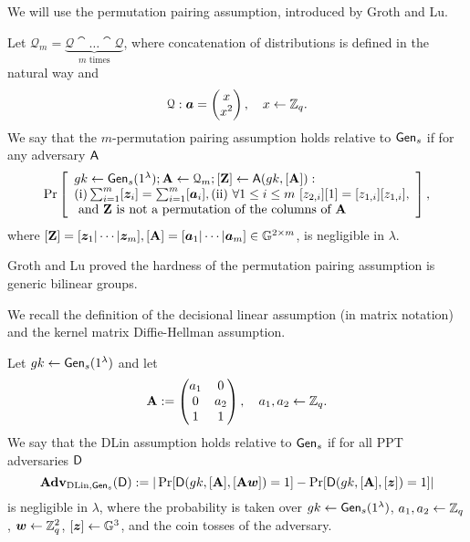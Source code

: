 We will use the permutation pairing assumption, introduced by Groth and Lu.
\begin{definition}\label{def:ppa}
Let $\mathcal{Q}_{m}=\underbrace{\mathcal{Q}\cat\ldots\cat\mathcal{Q}}_{m\text{ times}}$, where concatenation of  distributions is defined in the natural way and 
$$\mathcal{Q}: {\boldsymbol{a}}=\left(\begin{matrix}x\\x^2\end{matrix}\right),\quad x\gets\mathbb{Z}_q.$$
We say that the $m$-permutation pairing assumption holds relative to $\mathsf{Gen}_s$ if for any adversary $\mathsf{A}$
$$
\Pr\left[
\begin{array}{l}
gk\gets\mathsf{Gen}_s(1^\lambda);\mathbf{{A}}\gets\mathcal{Q}_{m};[\mathbf{{Z}}]\gets\mathsf{A}(gk,[\mathbf{{A}}]):\\
\mathrm{(i)} \sum_{i=1}^{m}[{\boldsymbol{z}}_i]=\sum_{i=1}^{m}[{\boldsymbol{a}}_i], \mathrm{(ii)}\ \forall 1\leq i\leq m\ [z_{2,i}][1]=[z_{1,i}][z_{1,i}],\\
\text{ and }\mathbf{{Z}}\text{ is not a permutation of the columns of }\mathbf{{A}}
\end{array}
\right],
$$
where $[\mathbf{{Z}}]=[{\boldsymbol{z}}_1|\cdots|{\boldsymbol{z}}_m], [\mathbf{{A}}]=[{\boldsymbol{a}}_1|\cdots|{\boldsymbol{a}}_m]\in\mathbb{G}^{2\times m}$,
is negligible in $\lambda$.
\end{definition}
Groth and Lu proved the hardness of the permutation pairing assumption is generic bilinear groups. 

We recall the definition of the decisional linear assumption (in matrix notation) and the kernel matrix Diffie-Hellman assumption.

\begin{definition}\label{def:dlin}
 Let  ${gk} 
\gets \mathsf{Gen}_s(1^\lambda)$ and let
$$
\mathbf{{A}} :=
\begin{pmatrix} 
a_1 & 0     \\
0     & a_2 \\
1     &  1
\end{pmatrix},
\quad
a_1,a_2\gets\mathbb{Z}_q.
$$
We say that the DLin assumption holds relative to $\mathsf{Gen}_s$ if for all PPT adversaries $\mathsf{D}$
$$
\mathbf{Adv}_{\mathrm{DLin},\mathsf{Gen}_s}(\mathsf{D}) := |
	\Pr[
		\mathsf{D}(
			gk,
			[\mathbf{{A}}],
			[\mathbf{{A}}{\boldsymbol{w}}])=1]
	-\Pr[
		\mathsf{D}(
		gk,
		[\mathbf{{A}}],
		[{\boldsymbol{z}}])=1]|
$$
is negligible in $\lambda$, where the probability is taken over $gk\gets\mathsf{Gen}_s(1^\lambda)$, $a_1,a_2\gets\mathbb{Z}_q$, ${\boldsymbol{w}}\gets\mathbb{Z}_q^2$, $[{\boldsymbol{z}}]\gets\mathbb{G}^3$, and the coin tosses of the adversary. 
\end{definition}

